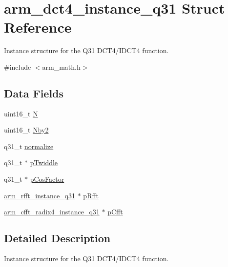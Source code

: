 \hypertarget{structarm__dct4__instance__q31}{\section{arm\-\_\-dct4\-\_\-instance\-\_\-q31 Struct Reference}
\label{structarm__dct4__instance__q31}
}


Instance structure for the Q31 D\-C\-T4/\-I\-D\-C\-T4 function.  




{\ttfamily \#include $<$arm\-\_\-math.\-h$>$}

\subsection*{Data Fields}
\begin{DoxyCompactItemize}
\item 
uint16\-\_\-t \hyperlink{structarm__dct4__instance__q31_a37d49571fe35012087153c093705cd11}{N}
\item 
uint16\-\_\-t \hyperlink{structarm__dct4__instance__q31_afa64b1618089e35c2b55cff71cb29715}{Nby2}
\item 
q31\-\_\-t \hyperlink{structarm__dct4__instance__q31_a3a2f571658a202a38fa508098001b47c}{normalize}
\item 
q31\-\_\-t $\ast$ \hyperlink{structarm__dct4__instance__q31_a2505b7d5ec077b244c712797a5253b6d}{p\-Twiddle}
\item 
q31\-\_\-t $\ast$ \hyperlink{structarm__dct4__instance__q31_af06acf18dc6547fc29aba2eb68cc63f0}{p\-Cos\-Factor}
\item 
\hyperlink{structarm__rfft__instance__q31}{arm\-\_\-rfft\-\_\-instance\-\_\-q31} $\ast$ \hyperlink{structarm__dct4__instance__q31_a16c74f8496e1691e62da3c57e0c676eb}{p\-Rfft}
\item 
\hyperlink{structarm__cfft__radix4__instance__q31}{arm\-\_\-cfft\-\_\-radix4\-\_\-instance\-\_\-q31} $\ast$ \hyperlink{structarm__dct4__instance__q31_a0b1f4a05c1824bab3b9bd837a260232a}{p\-Cfft}
\end{DoxyCompactItemize}


\subsection{Detailed Description}
Instance structure for the Q31 D\-C\-T4/\-I\-D\-C\-T4 function. 

